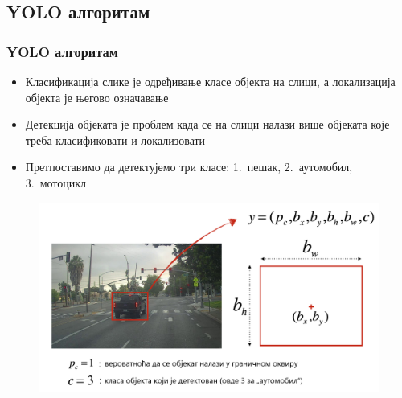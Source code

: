 \subsection{YOLO алгоритам}
\begin{frame}
\frametitle{YOLO алгоритам}
\begin{itemize}
 \item \alert{Класификација} слике је одређивање класе
објекта на слици, а \alert{локализација} објекта је његово означавање
 \item \alert{Детекција} објеката је проблем када се на слици
 налази више објеката које треба класификовати и локализовати
 \item Претпоставимо да детектујемо три класе: 1.\ пешак, 2.\ аутомобил,
 3.\ мотоцикл
\end{itemize}
  \begin{figure}[H]
    \centering
	\includegraphics[scale=0.18]{slike/box_label.png}
  \end{figure}
\end{frame}

